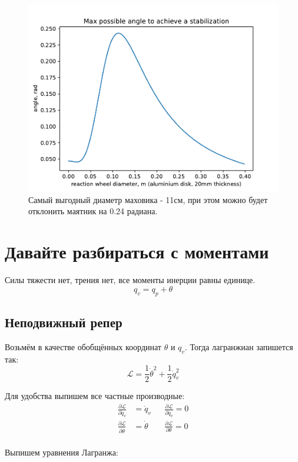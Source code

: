 \documentclass{article}
\begin{document}
\begin{figure}[tb]
\centerline{\includegraphics[width=.6\linewidth]{img/pendulum_dynamics}}
\caption{Самый выгодный диаметр маховика - 11см, при этом можно будет отклонить маятник на 0.24 радиана.}
\label{fig:rwdiameter}
\end{figure}


\iffalse

\newpage
\section{Давайте разбираться с моментами}
Силы тяжести нет, трения нет, все моменты инерции равны единице.
$$
q_v = q_p + \theta
$$

\subsection{Неподвижный репер}

Возьмём в качестве обобщённых координат $\theta$ и $q_v$. Тогда лагранжиан запишется так:
$$
\mathcal{L} = \frac{1}{2} \dot \theta^2 + \frac{1}{2}\dot q^2_v
$$

Для удобства выпишем все частные производные:
\begin{align*}
\frac{\partial\mathcal L}{\partial\dot q_v} &= \dot q_v   && \frac{\partial\mathcal L}{\partial q_v} = 0\\
\frac{\partial\mathcal L}{\partial\dot\theta} &= \dot\theta && \frac{\partial\mathcal L}{\partial\theta} = 0\\
\end{align*}

Выпишем уравнения Лагранжа:
\end{document}
